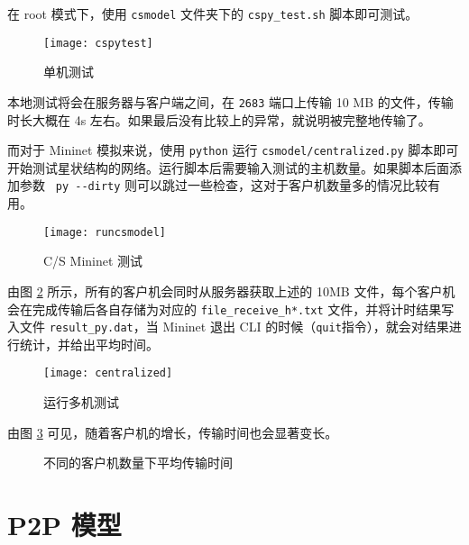 在 root 模式下，使用 \verb"csmodel" 文件夹下的 \verb"cspy_test.sh" 脚本即可测试。

\begin{figure}[H]
    \centering
    \texttt{[image: cspytest]}
    \caption{单机测试}
\end{figure}

本地测试将会在服务器与客户端之间，在 \verb"2683" 端口上传输 10 MB 的文件，传输时长大概在 4s 左右。如果最后没有比较上的异常，就说明被完整地传输了。


而对于 Mininet 模拟来说，使用 \verb"python" 运行 \verb"csmodel/centralized.py" 脚本即可开始测试星状结构的网络。运行脚本后需要输入测试的主机数量。如果脚本后面添加参数 \verb" py --dirty" 则可以跳过一些检查，这对于客户机数量多的情况比较有用。

\begin{figure}[H]
    \centering
    \texttt{[image: runcsmodel]}
    \caption{C/S Mininet 测试}\label{fig:csmodelrun}
\end{figure}

由图 \ref{fig:csmodeltest} 所示，所有的客户机会同时从服务器获取上述的 10MB 文件，每个客户机会在完成传输后各自存储为对应的 \verb"file_receive_h*.txt" 文件，并将计时结果写入文件 \verb"result_py.dat"，当 Mininet 退出 CLI 的时候（\verb"quit"指令），就会对结果进行统计，并给出平均时间。

\begin{figure}[H]
    \centering
    \texttt{[image: centralized]}
    \caption{运行多机测试}\label{fig:csmodeltest}
\end{figure}

由图 \ref{fig:csmodelstat} 可见，随着客户机的增长，传输时间也会显著变长。

\begin{figure}[H]
    \centering
    \caption{不同的客户机数量下平均传输时间}\label{fig:csmodelstat}
\end{figure}    

\section{P2P 模型}


